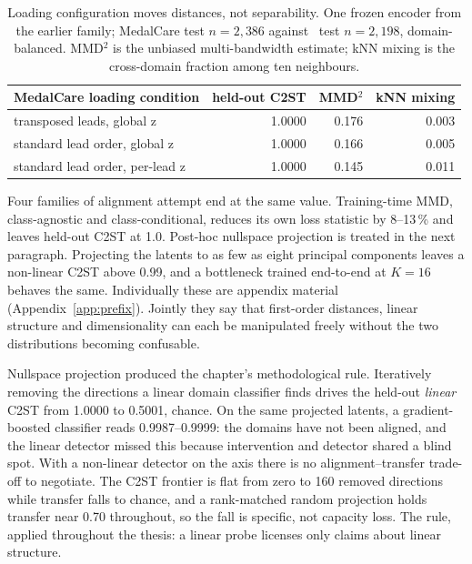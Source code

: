 \begin{table}[tb]
\centering\small
\caption{Loading configuration moves distances, not separability. One frozen encoder from the earlier family; MedalCare test $n=2{,}386$ against \ptbxl\ test $n=2{,}198$, domain-balanced. MMD$^2$ is the unbiased multi-bandwidth estimate; kNN mixing is the cross-domain fraction among ten neighbours.}
\label{tab:threecond}
\begin{tabular}{lrrr}
\toprule
MedalCare loading condition & held-out C2ST & MMD$^2$ & kNN mixing \\
\midrule
transposed leads, global z & 1.0000 & 0.176 & 0.003 \\
standard lead order, global z & 1.0000 & 0.166 & 0.005 \\
standard lead order, per-lead z & 1.0000 & 0.145 & 0.011 \\
\bottomrule
\end{tabular}
\end{table}

Four families of alignment attempt end at the same value. Training-time MMD, class-agnostic and class-conditional, reduces its own loss statistic by 8--13\,\% and leaves held-out C2ST at 1.0. Post-hoc nullspace projection is treated in the next paragraph. Projecting the latents to as few as eight principal components leaves a non-linear C2ST above 0.99, and a bottleneck trained end-to-end at $K=16$ behaves the same. Individually these are appendix material (Appendix~\ref{app:prefix}). Jointly they say that first-order distances, linear structure and dimensionality can each be manipulated freely without the two distributions becoming confusable. 

Nullspace projection produced the chapter's methodological rule. Iteratively removing the directions a linear domain classifier finds drives the held-out \emph{linear} C2ST from 1.0000 to 0.5001, chance. On the same projected latents, a gradient-boosted classifier reads 0.9987--0.9999: the domains have not been aligned, and the linear detector missed this because intervention and detector shared a blind spot. With a non-linear detector on the axis there is no alignment--transfer trade-off to negotiate. The C2ST frontier is flat from zero to 160 removed directions while transfer falls to chance, and a rank-matched random projection holds transfer near 0.70 throughout, so the fall is specific, not capacity loss. The rule, applied throughout the thesis: a linear probe licenses only claims about linear structure. 


